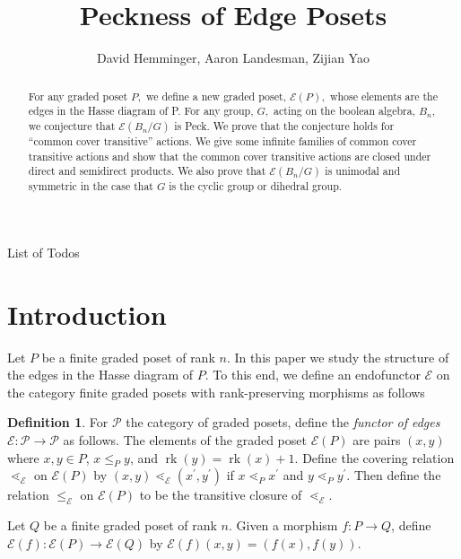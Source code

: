 \documentclass[10 pt]{amsart}
\title{Peckness of Edge Posets}
\author{David Hemminger, Aaron Landesman, Zijian Yao}
\makeatletter
\theoremstyle{plain}
\theoremstyle{definition}
\newtheorem{defn}[thm]{Definition}
\theoremstyle{remark}
\numberwithin{equation}{section}
\newcommand\rk{\operatorname{rk}}
\def\listtodoname{List of Todos}
\def\listoftodos{\@starttoc{tdo}\listtodoname}
\makeatother
\begin{document}
\begin{abstract}
For any graded poset $P,$ we define a new graded poset, $\mathcal E(P),$ whose elements are the edges in the Hasse diagram of P. For any group, $G,$ acting on the boolean algebra, $B_n,$ we conjecture that $\mathcal E(B_n/G)$ is Peck. We prove that the conjecture holds for ``common cover transitive'' actions. We give some infinite families of common cover transitive actions and show that the common cover transitive actions are closed under direct and semidirect products. We also prove that $\mathcal E(B_n/G)$ is unimodal and symmetric in the case that $G$ is the cyclic group or dihedral group.
\end{abstract}

\maketitle

\tableofcontents
\newpage

\listoftodos


\section{Introduction}\label{sec:introduction}

Let $P$ be a finite graded poset of rank $n$.  In this paper we study the structure of the edges in the Hasse diagram of $P$.  To this end, we define an endofunctor $\mathcal{E}$ on the category finite graded posets with rank-preserving morphisms as follows

\begin{defn}
\label{defn:functor_of_edges}
For $\mathcal P$ the category of graded posets, define the {\it functor of edges} $\mathcal{E}\colon\mathcal{P} \rightarrow \mathcal{P}$ as follows. The elements of the graded poset $\mathcal{E}(P)$ are pairs $(x, y)$ where $x,y\in P$, $x\le_P y$, and $\rk(y) = \rk(x) + 1$. Define the covering relation $\lessdot_{\mathcal{E}}$ on $\mathcal{E}(P)$ by $(x, y) \lessdot_{\mathcal{E}} (x^\prime, y^\prime)$ if $x\lessdot_P x^\prime$ and $y\lessdot_P y^\prime$. Then define the relation $\le_{\mathcal{E}}$ on $\mathcal{E}(P)$ to be the transitive closure of $\lessdot_{\mathcal{E}}$.

Let $Q$ be a finite graded poset of rank $n$. Given a morphism $f\colon P\rightarrow Q$, define $\mathcal{E}(f)\colon \mathcal{E}(P)\rightarrow \mathcal{E}(Q)$ by $\mathcal{E}(f)(x,y) = (f(x), f(y))$.
\end{defn}
\end{document}
